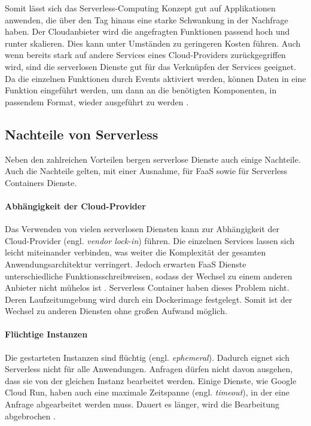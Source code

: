 Somit lässt sich das Serverless-Computing Konzept gut auf Applikationen anwenden,
die über den Tag hinaus eine starke Schwankung in der Nachfrage haben. Der Cloudanbieter wird
die angefragten Funktionen passend hoch und runter skalieren.
Dies kann unter Umständen zu geringeren Kosten führen.
Auch wenn bereits stark auf andere Services eines Cloud-Providers
zurückgegriffen wird, sind die serverlosen Dienste
gut für das Verknüpfen der Services geeignet. Da die einzelnen Funktionen durch Events
aktiviert werden, können Daten in eine Funktion eingeführt werden, um
dann an die benötigten Komponenten, in passendem Format, wieder ausgeführt zu werden
\cite{ServerlessTrends} \cite{HpcServerless}.

\subsection{Nachteile von Serverless}
Neben den zahlreichen Vorteilen bergen serverlose Dienste auch einige Nachteile.
Auch die Nachteile gelten, mit einer Ausnahme, für FaaS sowie für
Serverless Containers Dienste.

\paragraph{Abhängigkeit der Cloud-Provider} Das Verwenden von vielen serverlosen Diensten kann zur Abhängigkeit der
Cloud-Provider (engl. \emph{vendor lock-in}) führen. Die einzelnen
Services lassen sich leicht miteinander verbinden,
was weiter die Komplexität der gesamten Anwendungsarchitektur verringert. Jedoch erwarten
FaaS Dienste unterschiedliche Funktionsschreibweisen, sodass der Wechsel zu einem
anderen Anbieter nicht mühelos ist \cite{EcoArc}.
Serverless Container haben dieses Problem nicht.
Deren Laufzeitumgebung wird durch ein Dockerimage festgelegt.
Somit ist der Wechsel zu anderen Diensten ohne großen Aufwand
möglich.

\paragraph{Flüchtige Instanzen} Die gestarteten Instanzen sind flüchtig (engl. \emph{ephemeral}). Dadurch
eignet sich Serverless nicht für alle Anwendungen. Anfragen dürfen nicht davon ausgehen, dass sie von der
gleichen Instanz bearbeitet werden. Einige Dienste, wie Google Cloud Run,
haben auch eine maximale Zeitspanne (engl. \emph{timeout}), in der eine Anfrage abgearbeitet werden muss.
Dauert es länger, wird die Bearbeitung abgebrochen \cite{CloudRunTimeout}.

